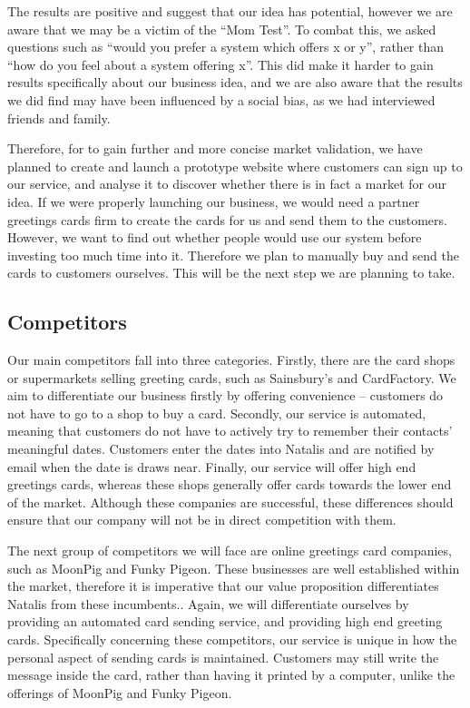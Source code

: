 \documentclass[10pt, a4paper]{article}
\begin{document}
The results are positive and suggest that our idea has potential, however we are aware that we may be a victim of the “Mom Test”. To combat this, we asked questions such as “would you prefer a system which offers x or y”, rather than “how do you feel about a system offering x”. This did make it harder to gain results specifically about our business idea, and we are also aware that the results we did find may have been influenced by a social bias, as we had interviewed friends and family.

Therefore, for to gain further and more concise market validation, we have planned to create and launch a prototype website where customers can sign up to our service, and analyse it to discover whether there is in fact a market for our idea. If we were properly launching our business, we would need a partner greetings cards firm to create the cards for us and send them to the customers. However, we want to find out whether people would use our system before investing too much time into it. Therefore we plan to manually buy and send the cards to customers ourselves. This will be the next step we are planning to take.

\subsection*{Competitors}
Our main competitors fall into three categories. Firstly, there are the card shops or supermarkets selling greeting cards, such as Sainsbury’s and CardFactory. We aim to differentiate our business firstly by offering convenience – customers do not have to go to a shop to buy a card. Secondly, our service is automated, meaning that customers do not have to actively try to remember their contacts' meaningful dates. Customers enter the dates into Natalis and are notified by email when the date is draws near.  Finally, our service will offer high end greetings cards, whereas these shops generally offer cards towards the lower end of the market. Although these companies are successful, these differences should ensure that our company will not be in direct competition with them.

The next group of competitors we will face are online greetings card companies, such as MoonPig and Funky Pigeon. These businesses are well established within the market, therefore it is imperative that our value proposition differentiates Natalis from these incumbents..
Again, we will differentiate ourselves by providing an automated card sending service, and providing high end greeting cards. Specifically concerning these competitors, our service is unique in how the personal aspect of sending cards is maintained. Customers may still write the message inside the card, rather than having it printed by a computer, unlike the offerings of MoonPig and Funky Pigeon.
\end{document}
